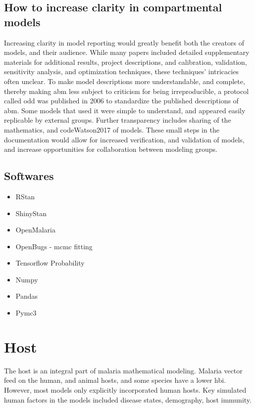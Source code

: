 \documentclass[a4paper, 12pt, twoside]{article}
\begin{document}
\subsection{How to increase clarity in compartmental models}%
\label{sub:incresing_clarity}
Increasing clarity in model reporting would greatly benefit both the creators of models, and their audience.
While many papers included detailed supplementary materials for additional results, project descriptions, and calibration, validation, sensitivity analysis, and optimization techniques, these techniques' intricacies often unclear.
To make model descriptions more understandable, and complete, thereby making \gls{abm} less subject to criticism for being irreproducible, a protocol called \gls{odd} \cite{Grimm2010} was published in 2006 to standardize the published descriptions of \gls{abm}.
Some models that used it \cite{Zhu2015, Zhu2015a, Watson2017} were simple to understand, and appeared easily replicable by external groups.
Further transparency includes sharing of the mathematics, and code{Watson2017} of models.
These small steps in the documentation would allow for increased verification, and validation of models, and increase opportunities for collaboration between modeling groups.

\subsection{Softwares}

\begin{itemize}
  \item RStan
	\item ShinyStan
	\item OpenMalaria
	\item OpenBugs - \gls{mcmc} fitting \cite{Lunn2009}
	\item Tensorflow Probability
	\item Numpy
	\item Pandas
	\item Pymc3
\end{itemize}

\section{Host}%
\label{sec:Host}
The host is an integral part of malaria mathematical modeling.
Malaria vector feed on the human, and animal hosts, and some species have a lower \gls{hbi}.
However, most models only explicitly incorporated human hosts.
Key simulated human factors in the models included disease states, demography, host immunity.
\end{document}

